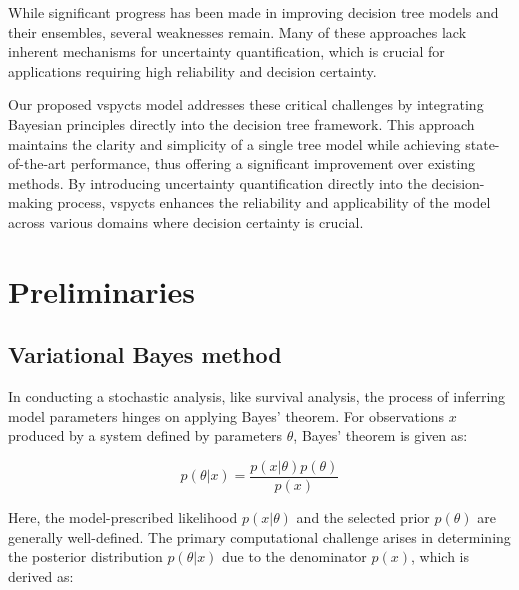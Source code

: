 \documentclass[3p,review,authoryear]{elsarticle}
\begin{document}
While significant progress has been made in improving decision tree models and their ensembles, several weaknesses remain.
Many of these approaches lack inherent mechanisms for uncertainty quantification, which is crucial for applications requiring high reliability and decision certainty.

Our proposed \glspl{vspyct} model addresses these critical challenges by integrating Bayesian principles directly into the decision tree framework.
This approach maintains the clarity and simplicity of a single tree model while achieving state-of-the-art performance, thus offering a significant improvement over existing methods.
By introducing uncertainty quantification directly into the decision-making process, \glspl{vspyct} enhances the reliability and applicability of the model across various domains where decision certainty is crucial.


\section{Preliminaries}

\subsection{Variational Bayes method}


In conducting a stochastic analysis, like survival analysis, the process of inferring model parameters hinges on applying Bayes' theorem.
For observations $x$ produced by a system defined by parameters $\theta$, Bayes' theorem is given as:

\begin{equation}
p(\theta|x)=\frac{p(x|\theta)p(\theta)}{p(x)}
\label{eq:bayes_rule}
\end{equation}

Here, the model-prescribed likelihood $p(x|\theta)$ and the selected prior $p(\theta)$ are generally well-defined.
The primary computational challenge arises in determining the posterior distribution $p(\theta|x)$ due to the denominator $p(x)$, which is derived as:
\end{document}
